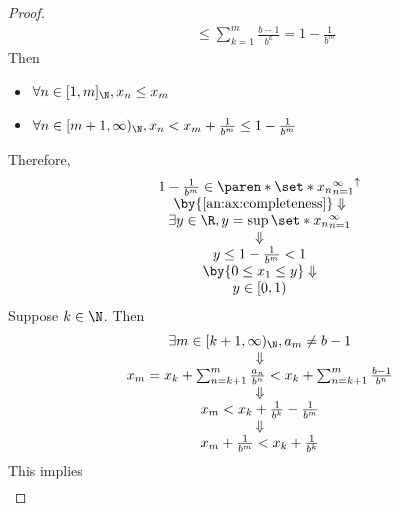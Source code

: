 \begin{proof}
\begin{align*}
                            & \leq \sum_{k = 1}^{m} \frac{b - 1}{b^{k}} = 1 - \frac{1}{b^{m}}
  \end{align*}
  Then
  \begin{itemize}
    \item $\forall n \in [1, m]_{\N}, x_{n} \leq x_{m}$
    \item $\forall n \in [m + 1, \infty)_{\N}, x_{n} < x_{m} + \frac{1}{b^{m}} \leq 1 - \frac{1}{b^{m}}$
  \end{itemize}
  Therefore,
  \[
    \begin{array}{c}
      1 - \frac{1}{b^{m}} \in \paren*{\set*{x_{n}}_{n = 1}^{\infty}}^{\uparrow} \\
      \by{\Cref{an:ax:completeness}} \Downarrow                                 \\
      \exists y \in \R, y = \sup \set*{x_{n}}_{n = 1}^{\infty}                  \\
      \Downarrow                                                                \\
      y \leq 1 - \frac{1}{b^{m}} < 1                                            \\
      \by{\ensuremath{0 \leq x_{1} \leq y}} \Downarrow                          \\
      y \in [0, 1)
    \end{array}
  \]
  Suppose $k \in \N$. Then
  \[
    \begin{array}{c}
      \exists m \in [k + 1, \infty)_{\N}, a_{m} \neq b - 1                                                        \\
      \Downarrow                                                                                                  \\
      x_{m} = x_{k} + \sum_{n = k + 1}^{m} \frac{a_{n}}{b^{n}} < x_{k} + \sum_{n = k + 1}^{m} \frac{b - 1}{b^{n}} \\
      \Downarrow                                                                                                  \\
      x_{m} < x_{k} + \frac{1}{b^{k}} - \frac{1}{b^{m}}                                                           \\
      \Downarrow                                                                                                  \\
      x_{m} + \frac{1}{b^{m}} < x_{k} + \frac{1}{b^{k}}
    \end{array}
  \]
  This implies
  \[
    \begin{array}{c}

\end{array}\]
\end{proof}
